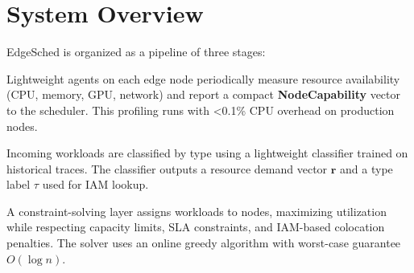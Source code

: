 \section{System Overview}

EdgeSched is organized as a pipeline of three stages:

\begin{tcolorbox}[colback=accentSlate!8,colframe=accentSlate!50,title=\textbf{Stage 1: Profiling},coltitle=white,colbacktitle=accentSlate]
Lightweight agents on each edge node periodically measure resource availability (CPU, memory, GPU, network) and report a compact \textbf{NodeCapability} vector to the scheduler. This profiling runs with \textless 0.1\% CPU overhead on production nodes.
\end{tcolorbox}

\vspace{8pt}
\begin{tcolorbox}[colback=accentSlate!8,colframe=accentSlate!50,title=\textbf{Stage 2: Workload Classification},coltitle=white,colbacktitle=accentSlate]
Incoming workloads are classified by type using a lightweight classifier trained on historical traces. The classifier outputs a resource demand vector \(\mathbf{r}\) and a type label \(\tau\) used for IAM lookup.
\end{tcolorbox}

\vspace{8pt}
\begin{tcolorbox}[colback=accentSlate!8,colframe=accentSlate!50,title=\textbf{Stage 3: Placement Optimization},coltitle=white,colbacktitle=accentSlate]
A constraint-solving layer assigns workloads to nodes, maximizing utilization while respecting capacity limits, SLA constraints, and IAM-based colocation penalties. The solver uses an online greedy algorithm with worst-case guarantee \(O(\log n)\).
\end{tcolorbox}
